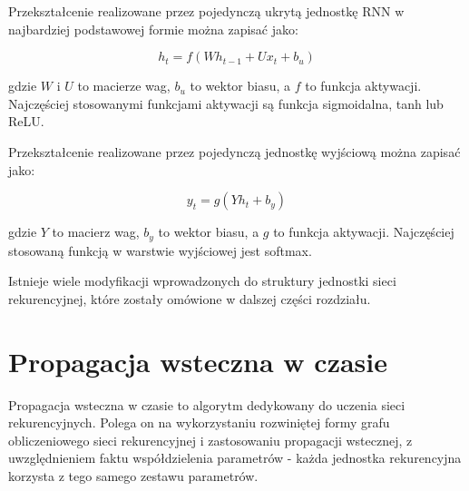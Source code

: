 \documentclass[oneside, mag]{mgr}
\begin{document}
Przekształcenie realizowane przez pojedynczą ukrytą jednostkę RNN w najbardziej podstawowej formie można zapisać jako:

\begin{equation}
	h_t = f(W h_{t-1} + U x_t + b_u)
\end{equation}

gdzie $W$ i $U$ to macierze wag, $b_u$ to wektor biasu, a $f$ to funkcja aktywacji. Najczęściej stosowanymi funkcjami aktywacji są funkcja sigmoidalna, tanh lub ReLU.

Przekształcenie realizowane przez pojedynczą jednostkę wyjściową można zapisać jako:

\begin{equation}
	y_t = g(Y h_t + b_y)
\end{equation}

gdzie $Y$ to macierz wag, $b_y$ to wektor biasu, a $g$ to funkcja aktywacji. Najczęściej stosowaną funkcją w warstwie wyjściowej jest softmax.

Istnieje wiele modyfikacji wprowadzonych do struktury jednostki sieci rekurencyjnej, które zostały omówione w dalszej części rozdziału.

\section{Propagacja wsteczna w czasie}

Propagacja wsteczna w czasie to algorytm dedykowany do uczenia sieci rekurencyjnych. Polega on na wykorzystaniu rozwiniętej formy grafu obliczeniowego sieci rekurencyjnej i zastosowaniu propagacji wstecznej, z uwzględnieniem faktu współdzielenia parametrów - każda jednostka rekurencyjna korzysta z tego samego zestawu parametrów.
\end{document}
